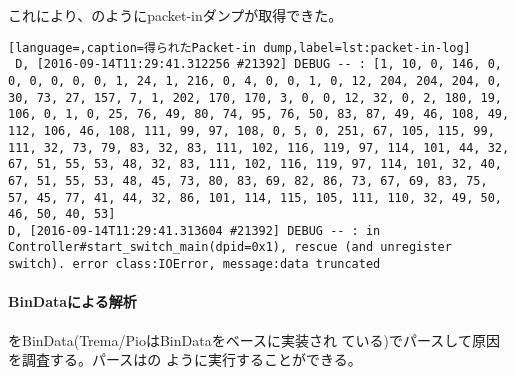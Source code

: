 これにより、のようにpacket-inダンプが取得できた。
\begin{lstlisting}[language=,caption=得られたPacket-in dump,label=lst:packet-in-log]
 D, [2016-09-14T11:29:41.312256 #21392] DEBUG -- : [1, 10, 0, 146, 0, 0, 0, 0, 0, 0, 1, 24, 1, 216, 0, 4, 0, 0, 1, 0, 12, 204, 204, 204, 0, 30, 73, 27, 157, 7, 1, 202, 170, 170, 3, 0, 0, 12, 32, 0, 2, 180, 19, 106, 0, 1, 0, 25, 76, 49, 80, 74, 95, 76, 50, 83, 87, 49, 46, 108, 49, 112, 106, 46, 108, 111, 99, 97, 108, 0, 5, 0, 251, 67, 105, 115, 99, 111, 32, 73, 79, 83, 32, 83, 111, 102, 116, 119, 97, 114, 101, 44, 32, 67, 51, 55, 53, 48, 32, 83, 111, 102, 116, 119, 97, 114, 101, 32, 40, 67, 51, 55, 53, 48, 45, 73, 80, 83, 69, 82, 86, 73, 67, 69, 83, 75, 57, 45, 77, 41, 44, 32, 86, 101, 114, 115, 105, 111, 110, 32, 49, 50, 46, 50, 40, 53]
D, [2016-09-14T11:29:41.313604 #21392] DEBUG -- : in Controller#start_switch_main(dpid=0x1), rescue (and unregister switch). error class:IOError, message:data truncated
\end{lstlisting}

    \paragraph{BinDataによる解析}
をBinData(Trema/PioはBinDataをベースに実装され
ている)でパースして原因を調査する。パースはの
ように実行することができる。

